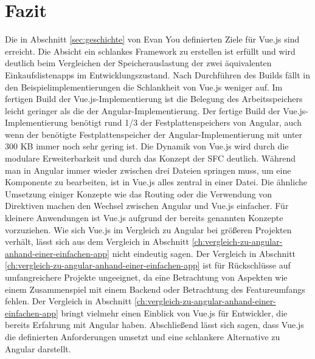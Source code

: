 

\chapter{Fazit}
Die in Abschnitt \ref{sec:geschichte} von Evan You definierten Ziele für Vue.js sind erreicht.
Die Absicht ein schlankes Framework zu erstellen ist erfüllt und wird deutlich beim Vergleichen der Speicherauslastung
der zwei äquivalenten Einkaufslistenapps im Entwicklungszustand.
Nach Durchführen des Builds fällt in den Beispielimplementierungen die Schlankheit von Vue.js weniger auf.
Im fertigen Build der Vue.js-Implementierung ist die Belegung des Arbeitsspeichers leicht geringer als die der Angular-Implementierung.
Der fertige Build der Vue.js-Implementierung benötigt rund 1/3 der Festplattenspeichers von Angular,
auch wenn der benötigte Festplattenspeicher der Angular-Implementierung mit unter 300 KB immer noch sehr gering ist.
Die Dynamik von Vue.js wird durch die modulare Erweiterbarkeit und durch das
Konzept der SFC deutlich.
Während man in Angular immer wieder zwischen drei Dateien springen muss, um eine Komponente zu bearbeiten,
ist in Vue.js alles zentral in einer Datei.
Die ähnliche Umsetzung einiger Konzepte wie das Routing oder die Verwendung von Direktiven machen
den Wechsel zwischen Angular und Vue.js einfacher.
Für kleinere Anwendungen ist Vue.js aufgrund der bereits genannten Konzepte vorzuziehen.
Wie sich Vue.js im Vergleich zu Angular bei größeren Projekten verhält, lässt sich aus dem Vergleich
in Abschnitt \ref{ch:vergleich-zu-angular-anhand-einer-einfachen-app} nicht eindeutig sagen.
Der Vergleich in Abschnitt \ref{ch:vergleich-zu-angular-anhand-einer-einfachen-app} ist für Rückschlüsse
auf umfangreichere Projekte ungeeignet, da eine Betrachtung von Aspekten wie einem Zusammenspiel mit einem Backend
oder Betrachtung des Featureumfangs fehlen.
Der Vergleich in Abschnitt \ref{ch:vergleich-zu-angular-anhand-einer-einfachen-app} bringt vielmehr einen
Einblick von Vue.js für Entwickler, die bereits Erfahrung mit Angular haben.
Abschließend lässt sich sagen, dass Vue.js die definierten
Anforderungen umsetzt und eine schlankere Alternative zu Angular
darstellt.
